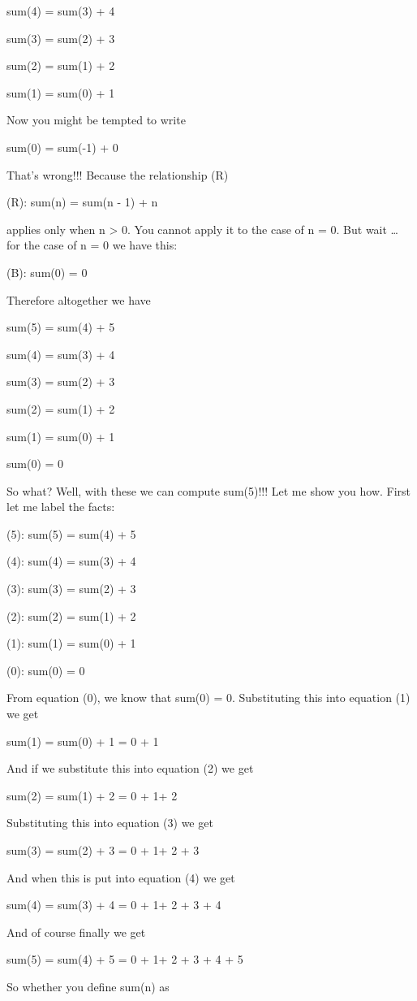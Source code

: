 sum(4) = sum(3) + 4

sum(3) = sum(2) + 3

sum(2) = sum(1) + 2

sum(1) = sum(0) + 1

Now you might be tempted to write

sum(0) = sum(-1) + 0

That's wrong!!! Because the relationship (R)

(R): sum(n) = sum(n - 1) + n

applies only when n > 0. You cannot apply it to the case of
n = 0. But wait \ldots{} for the case of n = 0 we have this:

(B): sum(0) = 0

Therefore altogether we have

sum(5) = sum(4) + 5

sum(4) = sum(3) + 4

sum(3) = sum(2) + 3

sum(2) = sum(1) + 2

sum(1) = sum(0) + 1

sum(0) = 0

So what? Well, with these we can compute sum(5)!!! Let me show you how.
First let me label the facts:

(5): sum(5) = sum(4) + 5

(4): sum(4) = sum(3) + 4

(3): sum(3) = sum(2) + 3

(2): sum(2) = sum(1) + 2

(1): sum(1) = sum(0) + 1

(0): sum(0) = 0

From equation (0), we know that sum(0) = 0. Substituting this into
equation (1) we get

sum(1) = sum(0) + 1 = 0 + 1

And if we substitute this into equation (2) we get

sum(2) = sum(1) + 2 = 0 + 1+ 2

Substituting this into equation (3) we get

sum(3) = sum(2) + 3 = 0 + 1+ 2 + 3

And when this is put into equation (4) we get

sum(4) = sum(3) + 4 = 0 + 1+ 2 + 3 + 4

And of course finally we get

sum(5) = sum(4) + 5 = 0 + 1+ 2 + 3 + 4 + 5

So whether you define sum(n) as


